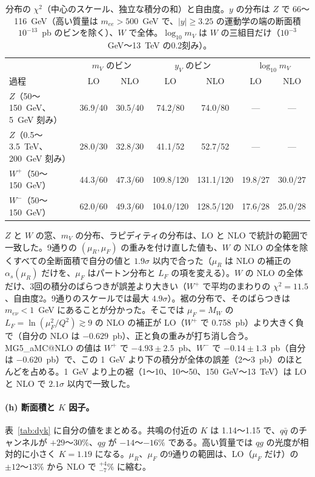 \documentclass[a4paper,10pt]{ltjsarticle}
\makeatletter
\newcommand{\MGaMC}{MG5\_aMC@NLO}
\makeatother
\begin{document}
\begin{table}[htbp]
\centering\small
\caption{分布の $\chi^2$（中心のスケール、独立な積分の和）と自由度。$y$ の分布は $Z$ で 66〜116~GeV（高い質量は $m_{ee}>500$~GeV で、$|y|\ge3.25$ の運動学の端の断面積 $10^{-13}$~pb のビンを除く）、$W$ で全体。$\log_{10}m_V$ は $W$ の三組目だけ（$10^{-3}$~GeV〜13~TeV の0.2刻み）。}
\label{tab:dychi}
\begin{tabular}{lcccccc}
\toprule
 & \multicolumn{2}{c}{$m_V$ のビン} & \multicolumn{2}{c}{$y_V$ のビン} & \multicolumn{2}{c}{$\log_{10}m_V$} \\
過程 & LO & NLO & LO & NLO & LO & NLO \\
\midrule
$Z$（50〜150~GeV、5~GeV 刻み） & 36.9/40 & 30.5/40 & 74.2/80 & 74.0/80 & — & — \\
$Z$（0.5〜3.5~TeV、200~GeV 刻み） & 28.0/30 & 32.8/30 & 41.1/52 & 52.7/52 & — & — \\
$W^+$（50〜150~GeV） & 44.3/60 & 47.3/60 & 109.8/120 & 131.1/120 & 19.8/27 & 30.0/27 \\
$W^-$（50〜150~GeV） & 62.0/60 & 49.3/60 & 104.0/120 & 128.5/120 & 17.6/28 & 25.0/28 \\
\bottomrule
\end{tabular}
\end{table}

$Z$ と $W$ の窓、$m_V$ の分布、ラピディティの分布は、LO と NLO で統計の範囲で一致した。9通りの $(\mu_R,\mu_F)$ の重みを付け直した値も、$W$ の NLO の全体を除くすべての全断面積で自分の値と $1.9\sigma$ 以内で合った（$\mu_R$ は NLO の補正の $\alpha_s(\mu_R)$ だけを、$\mu_F$ はパートン分布と $L_F$ の項を変える）。$W$ の NLO の全体だけ、3回の積分のばらつきが誤差より大きい（$W^+$ で平均のまわりの $\chi^2=11.5$、自由度2。9通りのスケールでは最大 $4.9\sigma$）。裾の分布で、そのばらつきは $m_{e\nu}<1$~GeV にあることが分かった。そこでは $\mu_F=M_W$ の $L_F=\ln(\mu_F^2/Q^2)\gtrsim9$ の NLO の補正が LO（$W^+$ で 0.758~pb）より大きく負で（自分の NLO は $-0.629$~pb）、正と負の重みが打ち消し合う。\MGaMC{} の値は $W^+$ で $-4.93\pm2.5$~pb、$W^-$ で $-0.14\pm1.3$~pb（自分は $-0.620$~pb）で、この 1~GeV より下の積分が全体の誤差（2〜3~pb）のほとんどを占める。1~GeV より上の裾（1〜10、10〜50、150~GeV〜13~TeV）は LO と NLO で $2.1\sigma$ 以内で一致した。

\paragraph{(h) 断面積と $K$ 因子。}表~\ref{tab:dyk} に自分の値をまとめる。共鳴の付近の $K$ は 1.14〜1.15 で、$q\bar q$ のチャンネルが $+29$〜$30\%$、$qg$ が $-14$〜$-16\%$ である。高い質量では $qg$ の光度が相対的に小さく $K=1.19$ になる。$\mu_R$、$\mu_F$ の9通りの範囲は、LO（$\mu_F$ だけ）の $\pm12$〜$13\%$ から NLO で $^{+4}_{-7}\%$ に縮む。
\end{document}
